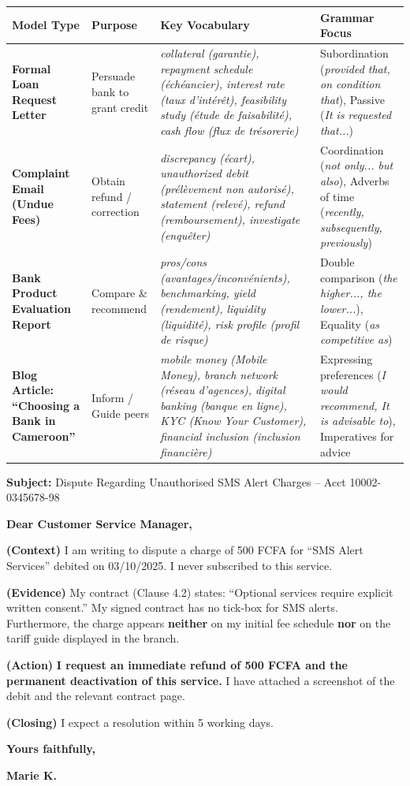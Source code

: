\documentclass[11pt]{article}
\begin{document}
\begin{center}
\begin{tabularx}{\linewidth}{|l|X|X|X|}\hline
\textbf{Model Type} & \textbf{Purpose} & \textbf{Key Vocabulary} & \textbf{Grammar Focus} \\\hline
\textbf{Formal Loan Request Letter} & Persuade bank to grant credit & \textit{collateral (garantie), repayment schedule (échéancier), interest rate (taux d'intérêt), feasibility study (étude de faisabilité), cash flow (flux de trésorerie)} & Subordination (\textit{provided that, on condition that}), Passive (\textit{It is requested that...}) \\\hline
\textbf{Complaint Email (Undue Fees)} & Obtain refund / correction & \textit{discrepancy (écart), unauthorized debit (prélèvement non autorisé), statement (relevé), refund (remboursement), investigate (enquêter)} & Coordination (\textit{not only... but also}), Adverbs of time (\textit{recently, subsequently, previously}) \\\hline
\textbf{Bank Product Evaluation Report} & Compare \& recommend & \textit{pros/cons (avantages/inconvénients), benchmarking, yield (rendement), liquidity (liquidité), risk profile (profil de risque)} & Double comparison (\textit{the higher..., the lower...}), Equality (\textit{as competitive as}) \\\hline
\textbf{Blog Article: ``Choosing a Bank in Cameroon''} & Inform / Guide peers & \textit{mobile money (Mobile Money), branch network (réseau d'agences), digital banking (banque en ligne), KYC (Know Your Customer), financial inclusion (inclusion financière)} & Expressing preferences (\textit{I would recommend, It is advisable to}), Imperatives for advice \\\hline
\end{tabularx}
\end{center}

\begin{exemplebox}
\textbf{Subject:} Dispute Regarding Unauthorised SMS Alert Charges -- Acct 10002-0345678-98\par
\textbf{Dear Customer Service Manager,}\par
\textbf{(Context)} I am writing to dispute a charge of 500 FCFA for ``SMS Alert Services'' debited on 03/10/2025. I never subscribed to this service.\par
\textbf{(Evidence)} My contract (Clause 4.2) states: ``Optional services require explicit written consent.'' My signed contract has no tick-box for SMS alerts. Furthermore, the charge appears \textbf{neither} on my initial fee schedule \textbf{nor} on the tariff guide displayed in the branch.\par
\textbf{(Action)} \textbf{I request an immediate refund of 500 FCFA and the permanent deactivation of this service.} I have attached a screenshot of the debit and the relevant contract page.\par
\textbf{(Closing)} I expect a resolution within 5 working days.\par
\textbf{Yours faithfully,}\par
\textbf{Marie K.}
\end{exemplebox}
\end{document}
